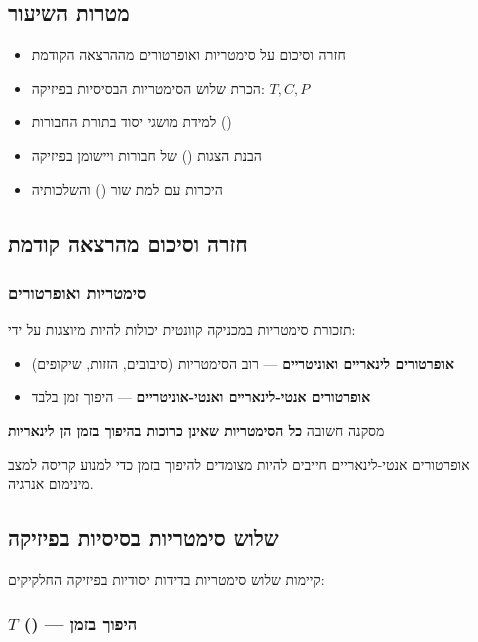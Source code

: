 
\subsection*{מטרות השיעור}
\begin{itemize}
    \item חזרה וסיכום על סימטריות ואופרטורים מההרצאה הקודמת
    \item הכרת שלוש הסימטריות הבסיסיות בפיזיקה: $T, C, P$
    \item למידת מושגי יסוד בתורת החבורות ()
    \item הבנת הצגות () של חבורות ויישומן בפיזיקה
    \item היכרות עם למת שור () והשלכותיה
\end{itemize}

\subsection{חזרה וסיכום מהרצאה קודמת}

\subsubsection*{סימטריות ואופרטורים}

\begin{notebox}{תזכורת}
סימטריות במכניקה קוונטית יכולות להיות מיוצגות על ידי:
\begin{itemize}
    \item \textbf{אופרטורים לינאריים ואוניטריים} — רוב הסימטריות (סיבובים, הזזות, שיקופים)
    \item \textbf{אופרטורים אנטי-לינאריים ואנטי-אוניטריים} — היפוך זמן בלבד
\end{itemize}
\end{notebox}

\begin{importantbox}{מסקנה חשובה}
\textbf{כל הסימטריות שאינן כרוכות בהיפוך בזמן הן לינאריות}

אופרטורים אנטי-לינאריים חייבים להיות מצומדים להיפוך בזמן כדי למנוע קריסה למצב מינימום אנרגיה.
\end{importantbox}

\subsection{שלוש סימטריות בסיסיות בפיזיקה}

קיימות שלוש סימטריות בדידות יסודיות בפיזיקה החלקיקים:

\subsubsection*{$T$ () — היפוך בזמן}

